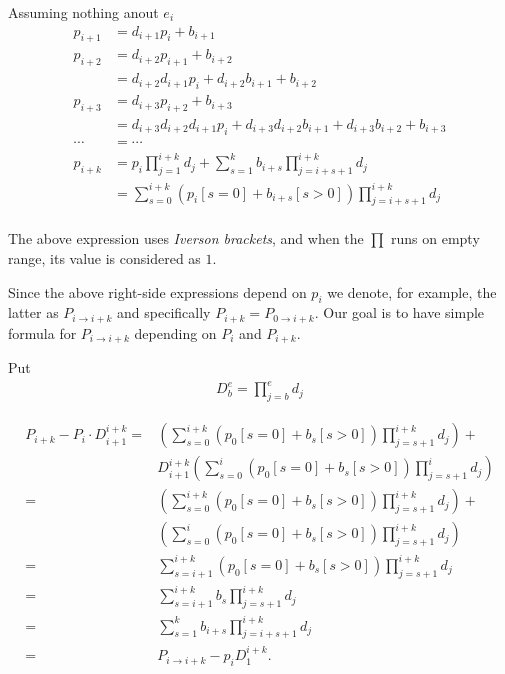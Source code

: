 \documentclass[10pt]{article}
\begin{document}
Assuming nothing anout \(e_i\)
\begin{align*}
p_{i+1} &= d_{i+1}p_i + b_{i+1}\\
p_{i+2} &= d_{i+2}p_{i+1} + b_{i+2} \\
        &= d_{i+2} d_{i+1} p_i + d_{i+2} b_{i+1} + b_{i+2} \\
p_{i+3} &= d_{i+3}p_{i+2} + b_{i+3} \\
        &= d_{i+3}d_{i+2}d_{i+1}p_i + d_{i+3}d_{i+2}b_{i+1} + 
           d_{i+3}b_{i+2} + b_{i+3} \\
\cdots  &= \cdots \\
p_{i+k} &= p_i \prod_{j=1}^{i+k} d_j +
           \sum_{s=1}^k b_{i+s} \prod_{j=i+s+1}^{i+k} d_j \\
        &= \sum_{s=0}^{i+k} (p_i[s=0] + b_{i+s}[s>0]) \prod_{j=i+s+1}^{i+k} d_j \\
\end{align*}

The above expression uses \emph{Iverson brackets},
and when the \(\prod\) runs on empty range, its value
is considered as $1$.
 
Since the above right-side expressions depend on \(p_i\)
we denote, for example, the latter as \(P_{i \to i+k}\)
and specifically \(P_{i+k} = P_{0 \to i+k}\).
Our goal is to have simple formula for \(P_{i\to i+k}\)
depending on \(P_i\) and \(P_{i+k}\).

Put
\begin{align*}
D_b^e = \prod_{j=b}^e d_j
\end{align*}

\begin{align*}
P_{i+k} - P_i \cdot D_{i+1}^{i+k} 
=& \left(\sum_{s=0}^{i+k} (p_0[s=0] + b_s[s>0]) \prod_{j=s+1}^{i+k} d_j\right) + \\
 & D_{i+1}^{i+k} 
   \left(
   \sum_{s=0}^i (p_0[s=0] + b_s[s>0]) \prod_{j=s+1}^i d_j
   \right) \\
=& \left(\sum_{s=0}^{i+k} (p_0[s=0] + b_s[s>0]) \prod_{j=s+1}^{i+k} d_j\right) + \\
 & \left(
   \sum_{s=0}^i (p_0[s=0] + b_s[s>0]) \prod_{j=s+1}^{i+k} d_j
   \right) \\
=& \sum_{s=i+1}^{i+k} (p_0[s=0] + b_s[s>0]) \prod_{j=s+1}^{i+k} d_j \\
=& \sum_{s=i+1}^{i+k} b_s \prod_{j=s+1}^{i+k} d_j \\
=& \sum_{s=1}^k b_{i+s} \prod_{j=i+s+1}^{i+k} d_j \\
=& P_{i\to i+k} -  p_i D_1^{i+k}.
\end{align*}
\end{document}
